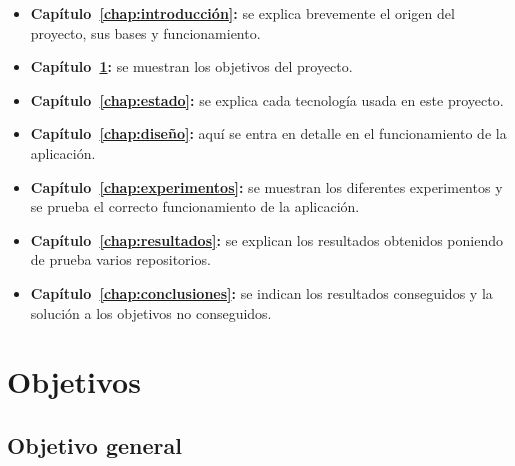 \documentclass[a4paper, 12pt]{book}
\begin{document}
\begin{itemize}
  \item \textbf{Capítulo~\ref{chap:introducción}:} se explica brevemente el origen del proyecto, sus bases y funcionamiento.
  
  \item \textbf{Capítulo~\ref{chap:objetivos}:} se muestran los objetivos del proyecto.
  
  \item \textbf{Capítulo~\ref{chap:estado}:} se explica cada tecnología usada en este proyecto.
  
  \item \textbf{Capítulo~\ref{chap:diseño}:} aquí se entra en detalle en el funcionamiento de la aplicación.
  
  \item \textbf{Capítulo~\ref{chap:experimentos}:} se muestran los diferentes experimentos y se prueba el correcto funcionamiento de la aplicación.
  
  \item \textbf{Capítulo~\ref{chap:resultados}:} se explican los resultados obtenidos poniendo de prueba varios repositorios.
  
  \item \textbf{Capítulo~\ref{chap:conclusiones}:} se indican los resultados conseguidos y la solución a los objetivos no conseguidos.
  
\end{itemize}




\cleardoublepage %
\chapter{Objetivos} %
\label{chap:objetivos} %

\section{Objetivo general} %
\label{sec:objetivo-general} %
\end{document}
